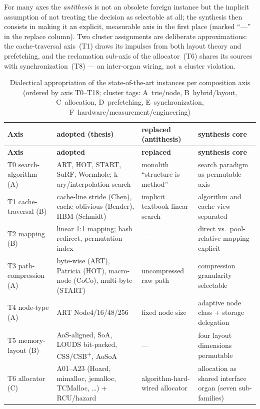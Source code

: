 For many axes the \emph{antithesis} is not an obsolete foreign instance but the implicit assumption
of not treating the decision as selectable at all; the synthesis then consists in making it an
explicit, measurable axis in the first place (marked \enquote{---} in the replace column). Two
cluster assignments are deliberate approximations: the cache-traversal axis~(T1) draws its impulses
from both layout theory and prefetching, and the reclamation sub-axis of the allocator~(T6) shares
its sources with synchronization~(T8) --- an inter-organ wiring, not a cluster violation.

{\footnotesize
\begin{longtable}{@{}p{2.3cm}p{3.7cm}p{2.7cm}p{3.6cm}@{}}
\caption{Dialectical appropriation of the state-of-the-art instances per composition axis (ordered by axis T0--T18; cluster tags: A~trie/node, B~hybrid/layout, C~allocation, D~prefetching, E~synchronization, F~hardware/measurement/engineering)}\label{tab:dialectic}\\
\toprule
\textbf{Axis} & \textbf{adopted (thesis)} & \textbf{replaced (antithesis)} & \textbf{synthesis core} \\
\midrule
\endfirsthead%
\toprule
\textbf{Axis} & \textbf{adopted} & \textbf{replaced} & \textbf{synthesis core} \\
\midrule
\endhead%
\bottomrule
\endlastfoot%
T0 search-algorithm (A) & ART, HOT, START, SuRF, Wormhole; k-ary/interpolation search & monolith \enquote{structure is method} & search paradigm as permutable axis \\
T1 cache-traversal (B) & cache-line stride (Chen), cache-oblivious (Bender), HBM (Schmidt) & implicit textbook linear search & algorithm and cache view separated \\
T2 mapping (B) & linear 1:1 mapping; hash redirect, permutation index & --- & direct vs.\ pool-relative mapping explicit \\
T3 path-compression (A) & byte-wise (ART), Patricia (HOT), macro-node (CoCo), multi-byte (START) & uncompressed raw path & compression granularity selectable \\
T4 node-type (A) & ART Node4/16/48/256 & fixed node size & adaptive node class + storage delegation \\
T5 memory-layout (B) & AoS-aligned, SoA, LOUDS bit-packed, CSS/CSB\textsuperscript{+}, AoSoA & --- & four layout dimensions permutable \\
T6 allocator (C) & A01--A23 (Hoard, mimalloc, jemalloc, TCMalloc, \ldots) + RCU/hazard & algorithm-hard-wired allocator & allocation as shared interface organ (seven sub-families) \\

\end{longtable}}
